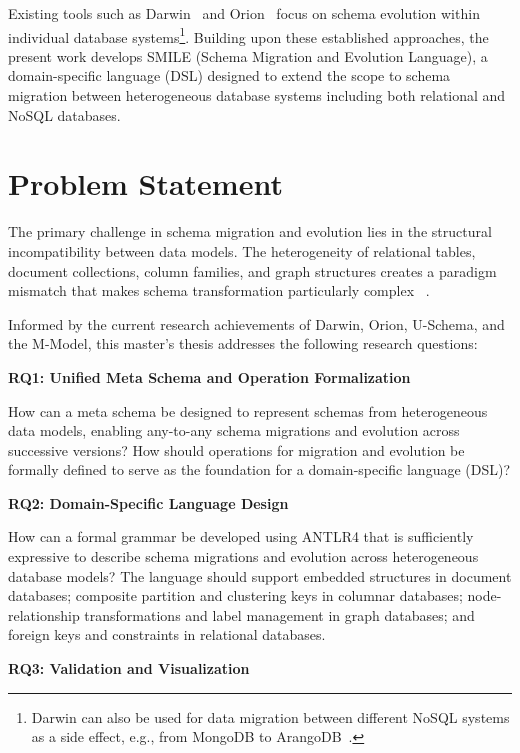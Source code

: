 Existing tools such as Darwin~\cite{storl2022darwin} and Orion~\cite{chillon2022taxonomy} focus on schema evolution within individual database systems\footnote{Darwin can also be used for data migration between different NoSQL systems as a side effect, e.g., from MongoDB to ArangoDB~\cite{storl2022darwin}.}. Building upon these established approaches, the present work develops SMILE  (Schema Migration and Evolution Language), a domain-specific language (DSL) designed to extend the scope to schema migration between heterogeneous database systems including both relational and NoSQL databases.

%
\section{Problem Statement}
\label{sec:intro:Problem Statement}
The primary challenge in schema migration and evolution lies in the structural incompatibility between data models. The heterogeneity of relational tables, document collections, column families, and graph structures creates a paradigm mismatch that makes schema transformation particularly complex ~\cite{ googlecloud2024heterogeneous}.

Informed by the current research achievements of Darwin, Orion, U-Schema, and the M-Model, this master's thesis addresses the following research questions:

\textbf{RQ1: Unified Meta Schema and Operation Formalization}

How can a meta schema be designed to represent schemas from heterogeneous data models, enabling any-to-any schema migrations and evolution across successive versions? How should operations for migration and evolution be formally defined to serve as the foundation for a domain-specific language (DSL)?

\textbf{RQ2: Domain-Specific Language Design}

How can a formal grammar be developed using ANTLR4 that is sufficiently expressive to describe schema migrations and evolution across heterogeneous database models? The language should support embedded structures in document databases; composite partition and clustering keys in columnar databases; node-relationship transformations and label management in graph databases; and foreign keys and constraints in relational databases.

\textbf{RQ3: Validation and Visualization}

